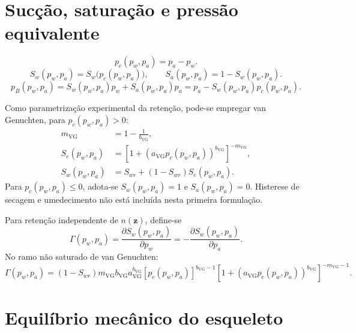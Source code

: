 \documentclass[11pt,a4paper]{article}
\numberwithin{equation}{section}
\begin{document}
\section{Suc\c{c}\~ao, satura\c{c}\~ao e press\~ao equivalente}

\begin{equation}
\boxed{p_c(p_w,p_a)=p_a-p_w.}
\end{equation}
\begin{equation}
\boxed{S_w(p_w,p_a)=S_w\bigl(p_c(p_w,p_a)\bigr),\qquad
S_a(p_w,p_a)=1-S_w(p_w,p_a).}
\end{equation}
\begin{equation}
\boxed{p_B(p_w,p_a)=S_w(p_w,p_a)p_w+S_a(p_w,p_a)p_a
=p_a-S_w(p_w,p_a)p_c(p_w,p_a).}
\end{equation}

Como parametriza\c{c}\~ao experimental da reten\c{c}\~ao, pode-se empregar
van Genuchten, para $p_c(p_w,p_a)>0$:
\begin{align}
m_{\mathrm{VG}}&=1-\frac{1}{b_{\mathrm{VG}}},\\
S_e(p_w,p_a)&=\left[1+\left(a_{\mathrm{VG}}p_c(p_w,p_a)\right)^{b_{\mathrm{VG}}}\right]^{-m_{\mathrm{VG}}},\\
\boxed{S_w(p_w,p_a)}&\boxed{=S_{wr}+(1-S_{wr})S_e(p_w,p_a).}
\end{align}
Para $p_c(p_w,p_a)\leq0$, adota-se $S_w(p_w,p_a)=1$ e
$S_a(p_w,p_a)=0$. Histerese de secagem e umedecimento n\~ao est\'a
inclu\'ida nesta primeira formula\c{c}\~ao.

Para reten\c{c}\~ao independente de $n(\mathbf z)$, define-se
\begin{equation}
\boxed{\Gamma(p_w,p_a)=\frac{\partial S_w(p_w,p_a)}{\partial p_w}
=-\frac{\partial S_w(p_w,p_a)}{\partial p_a}.}
\end{equation}
No ramo n\~ao saturado de van Genuchten:
\begin{equation}
\Gamma(p_w,p_a)=(1-S_{wr})m_{\mathrm{VG}}b_{\mathrm{VG}}
a_{\mathrm{VG}}^{b_{\mathrm{VG}}}
[p_c(p_w,p_a)]^{b_{\mathrm{VG}}-1}
\left[1+\left(a_{\mathrm{VG}}p_c(p_w,p_a)\right)^{b_{\mathrm{VG}}}\right]^{-m_{\mathrm{VG}}-1}.
\end{equation}

\section{Equil\'ibrio mec\^anico do esqueleto}\label{sec:equilibrio}
\end{document}
